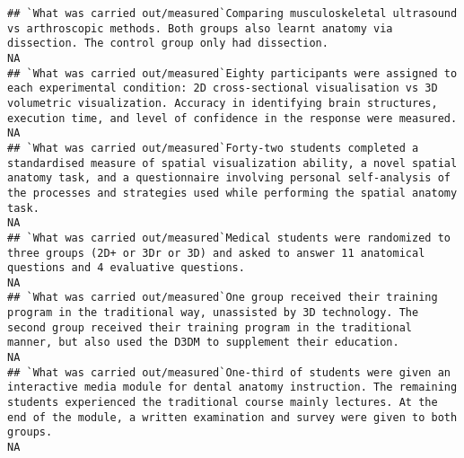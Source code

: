 \documentclass[]{article}
\begin{document}
\begin{verbatim}
## `What was carried out/measured`Comparing musculoskeletal ultrasound vs arthroscopic methods. Both groups also learnt anatomy via dissection. The control group only had dissection.                                                                                                                                                                                                                                                                                                   NA
## `What was carried out/measured`Eighty participants were assigned to each experimental condition: 2D cross-sectional visualisation vs 3D volumetric visualization. Accuracy in identifying brain structures, execution time, and level of confidence in the response were measured.                                                                                                                                                                                                    NA
## `What was carried out/measured`Forty-two students completed a standardised measure of spatial visualization ability, a novel spatial anatomy task, and a questionnaire involving personal self-analysis of the processes and strategies used while performing the spatial anatomy task.                                                                                                                                                                                               NA
## `What was carried out/measured`Medical students were randomized to three groups (2D+ or 3Dr or 3D) and asked to answer 11 anatomical questions and 4 evaluative questions.                                                                                                                                                                                                                                                                                                            NA
## `What was carried out/measured`One group received their training program in the traditional way, unassisted by 3D technology. The second group received their training program in the traditional manner, but also used the D3DM to supplement their education.                                                                                                                                                                                                                       NA
## `What was carried out/measured`One-third of students were given an interactive media module for dental anatomy instruction. The remaining students experienced the traditional course mainly lectures. At the end of the module, a written examination and survey were given to both groups.                                                                                                                                                                                          NA

\end{verbatim}
\end{document}
